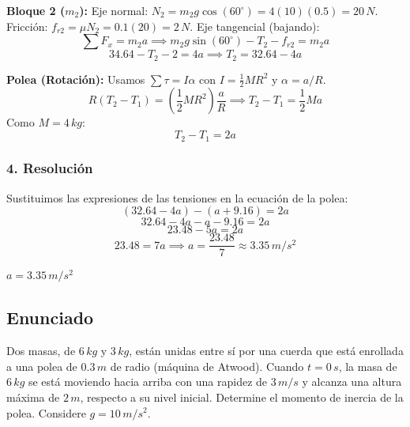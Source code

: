 \documentclass[12pt, a4paper]{article}
\begin{document}
\textbf{Bloque 2 ($m_2$):}
Eje normal: $N_2 = m_2 g \cos(60^\circ) = 4(10)(0.5) = 20 \, \si{N}$.
Fricción: $f_{r2} = \mu N_2 = 0.1(20) = 2 \, \si{N}$.
Eje tangencial (bajando):
$$\sum F_x = m_2 a \implies m_2 g \sin(60^\circ) - T_2 - f_{r2} = m_2 a$$
$$34.64 - T_2 - 2 = 4a \implies T_2 = 32.64 - 4a$$

\textbf{Polea (Rotación):}
Usamos $\sum \tau = I \alpha$ con $I = \frac{1}{2} M R^2$ y $\alpha = a/R$.
$$R(T_2 - T_1) = \left(\frac{1}{2} M R^2\right) \frac{a}{R} \implies T_2 - T_1 = \frac{1}{2} M a$$
Como $M = 4 \, \si{kg}$:
$$T_2 - T_1 = 2a$$

\subsubsection*{4. Resolución}
Sustituimos las expresiones de las tensiones en la ecuación de la polea:
$$(32.64 - 4a) - (a + 9.16) = 2a$$
$$32.64 - 4a - a - 9.16 = 2a$$
$$23.48 - 5a = 2a$$
$$23.48 = 7a \implies a = \frac{23.48}{7} \approx 3.35 \, \si{m/s^2}$$

\begin{tcolorbox}[colback=green!5!white, colframe=green!50!black, title=Respuesta Final]
\centering \Large $a = 3.35 \, \si{m/s^2}$
\end{tcolorbox}

\newpage

\subsection*{Enunciado}
Dos masas, de $6 \, \si{kg}$ y $3 \, \si{kg}$, están unidas entre sí por una cuerda que está enrollada a una polea de $0.3 \, \si{m}$ de radio (máquina de Atwood). Cuando $t = 0 \, \si{s}$, la masa de $6 \, \si{kg}$ se está moviendo hacia arriba con una rapidez de $3 \, \si{m/s}$ y alcanza una altura máxima de $2 \, \si{m}$, respecto a su nivel inicial. Determine el momento de inercia de la polea. Considere $g = 10 \, \si{m/s^2}$.

\begin{center}
\end{center}
\end{document}
